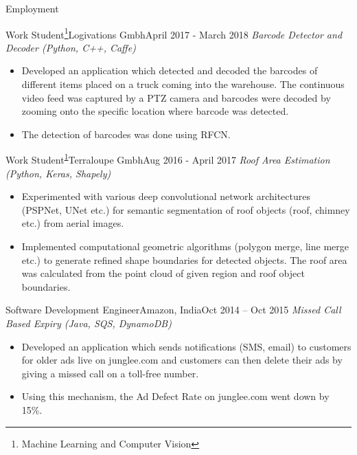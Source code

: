 \documentclass[]{mcdowellcv}
\begin{document}
\begin{cvsection}{Employment}
\begin{cvsubsection}{Work Student\footnote{Machine Learning and Computer Vision\label{ws}}}{Logivations Gmbh}{April 2017 - March 2018}
            \textit{Barcode Detector and Decoder (Python, C++, Caffe)}
            \begin{itemize}
                \item Developed an application which detected and decoded the barcodes of different items placed on a truck coming into the warehouse. The continuous video feed was captured by a PTZ camera and barcodes were decoded by zooming onto the specific location where barcode was detected.
                \item The detection of barcodes was done using RFCN.
            \end{itemize}
            
        \end{cvsubsection}
        
        \begin{cvsubsection}{Work Student\textsuperscript{\ref{ws}}}{Terraloupe Gmbh}{Aug 2016 - April 2017}
            \textit{Roof Area Estimation (Python, Keras, Shapely)}
            \begin{itemize}
                \item Experimented with various deep convolutional network architectures (PSPNet, UNet etc.) for semantic segmentation of roof objects (roof, chimney etc.) from aerial images.
                \item Implemented computational geometric algorithms (polygon merge, line merge etc.) to generate refined shape boundaries for detected objects. The roof area was calculated from the point cloud of given region and roof object boundaries.
            \end{itemize}
        \end{cvsubsection}

  \newpage        
          
        \begin{cvsubsection}{Software Development Engineer}{Amazon, India}{Oct 2014 -- Oct 2015}        
        \textit{Missed Call Based Expiry (Java, SQS, DynamoDB)}
            \begin{itemize}
                \item Developed an application which sends notifications (SMS, email) to customers for older ads live on junglee.com and customers can then delete their ads by giving a missed call on a toll-free number. 
                \item Using this mechanism, the Ad Defect Rate on junglee.com went down by 15\%.
            \end{itemize}
        \end{cvsubsection}


\end{cvsection}
\end{document}
